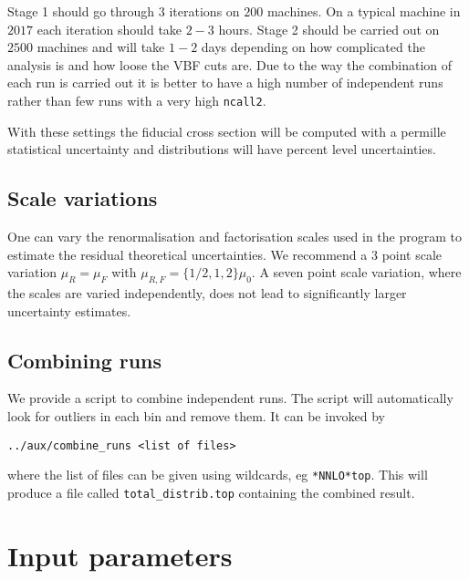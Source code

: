 \documentclass[12pt,a4]{article}
\begin{document}
Stage 1 should go through $3$ iterations on $200$ machines.
%
On a typical machine in $2017$ each iteration should take $2-3$ hours.
%
Stage 2 should be carried out on $2500$ machines and will take $1-2$
days depending on how complicated the analysis is and how loose the
VBF cuts are.
%
Due to the way the combination of each run is carried out it is better
to have a high number of independent runs rather than few runs with a
very high \texttt{ncall2}.

With these settings the fiducial cross section will be computed with a
permille statistical uncertainty and distributions will have percent
level uncertainties.

\subsection{Scale variations}
One can vary the renormalisation and factorisation scales used in
the program to estimate the residual theoretical uncertainties.
%
We recommend a $3$ point scale variation $\mu_R=\mu_F$ with
$\mu_{R,F}=\{1/2,1,2\}\mu_0$.
%
A seven point scale variation, where the scales are varied
independently, does not lead to significantly larger uncertainty
estimates.

\subsection{Combining runs}
We provide a script to combine independent runs.
%
The script will automatically look for outliers in each bin and remove
them.
%
It can be invoked by
%
\begin{verbatim}
../aux/combine_runs <list of files>
\end{verbatim}
%
where the list of files can be given using wildcards, eg
\texttt{*NNLO*top}.
%
This will produce a file called \texttt{total\_distrib.top} containing
the combined result.


\section{Input parameters}
\end{document}
